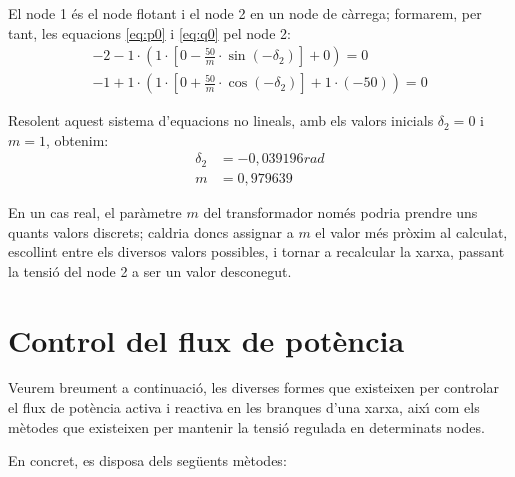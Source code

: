 \begin{exemple}
El node 1 \'{e}s el node flotant i el node 2 en un node de c\`{a}rrega; formarem, per tant,  les equacions \eqref{eq:p0} i \eqref{eq:q0} pel node 2:
\begin{align*}
-2 - 1 \cdot\left( 1 \cdot\left[ 0 -\frac{50}{m} \cdot\sin(-\delta_2) \right]  + 0 \right)  = 0   \\[1.5ex]
-1 + 1 \cdot\left( 1 \cdot\left[0 + \frac{50}{m}
\cdot\cos(-\delta_2) \right]  + 1\cdot (-50) \right)  = 0
\end{align*}

Resolent aquest sistema d'equacions no lineals, amb els valors
inicials $\delta_2=0$ i $m=1$, obtenim:
\begin{align*}
   \delta_2 &= -0{,}039196\unit{rad} \\[1ex]
   m & =0{,}979639
\end{align*}

En un cas real, el par\`{a}metre $m$ del transformador nom\'{e}s podria
prendre uns quants valors discrets; caldria doncs assignar a $m$ el
valor m\'{e}s pr\`{o}xim al calculat, escollint entre els diversos valors
possibles, i tornar a recalcular la xarxa, passant la tensi\'{o} del
node 2 a ser un valor desconegut.

\end{exemple}

\section{Control del flux de pot\`{e}ncia} 

Veurem breument a continuaci\'{o}, les diverses formes que existeixen
per controlar el flux de pot\`{e}ncia activa i reactiva en les branques
d'una xarxa, aix\'{\i} com els m\`{e}todes que existeixen per mantenir la
tensi\'{o} regulada en determinats nodes.

En concret, es disposa dels seg\"{u}ents m\`{e}todes:

